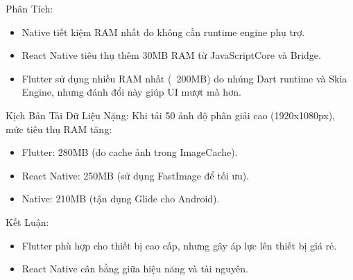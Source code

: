     \begin{flushleft}
      \hspace*{0.8cm}Phân Tích:
      \setlength{\leftmargini}{1.5cm}
      \begin{itemize}
          \item Native tiết kiệm RAM nhất do không cần runtime engine phụ trợ.
          \item React Native tiêu thụ thêm 30MB RAM từ JavaScriptCore và Bridge.
          \item Flutter sử dụng nhiều RAM nhất (~200MB) do nhúng Dart runtime và Skia Engine, nhưng đánh đổi này giúp UI mượt mà hơn.
      \end{itemize}
    \end{flushleft}

    \begin{flushleft}
      \hspace*{0.8cm}Kịch Bản Tải Dữ Liệu Nặng: Khi tải 50 ảnh độ phân giải cao (1920x1080px), mức tiêu thụ RAM tăng:
      \setlength{\leftmargini}{1.5cm}
      \begin{itemize}
          \item Flutter: 280MB (do cache ảnh trong ImageCache).
          \item React Native: 250MB (sử dụng FastImage để tối ưu).
          \item Native: 210MB (tận dụng Glide cho Android).
      \end{itemize}
    \end{flushleft}

    \begin{flushleft}
      \hspace*{0.8cm}Kết Luận:
      \setlength{\leftmargini}{1.5cm}
      \begin{itemize}
          \item Flutter phù hợp cho thiết bị cao cấp, nhưng gây áp lực lên thiết bị giá rẻ.
          \item React Native cân bằng giữa hiệu năng và tài nguyên.
      \end{itemize}
    \end{flushleft}

